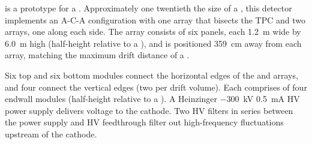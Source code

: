 

 \cite{protoDUNSP-tdr} is a prototype for a . %
Approximately one twentieth the size of a , this detector implements an A-C-A configuration with one  array that bisects the TPC and two  arrays, one along each side. 
The  array consists of %
six  panels, each \SI{1.2}{m} wide by \SI{6.0}{m} high (half-height relative to a ), 
and is positioned \SI{359}{cm} away from each  array, matching the maximum drift distance of a .

Six top and six bottom  modules connect the horizontal edges of the  and  arrays, and four %
 connect the vertical edges (two per drift volume).
Each  comprises of four endwall modules (half-height relative to a ).
A Heinzinger $-$\SI{300}{kV} \SI{0.5}{mA} HV power supply delivers voltage to the cathode.
Two HV filters in series between the power supply and HV feedthrough filter out high-frequency fluctuations upstream of the cathode.

